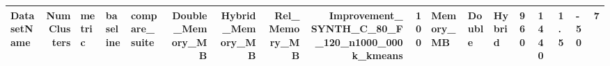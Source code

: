 \begin{tabular}{lrlllrrrrr}
\toprule
DatasetName & NumClusters & metric & baseline & compare_suite & Double_Memory_MB & Hybrid_Memory_MB & Rel_Memory_MB & Improvement_%
\midrule
SYNTH_C_80_F_120_n1000_000k_kmeans & 100 & Memory_MB & Double & Hybrid & 960 & 1440 & 1.5 & -50 & 7 \\
\bottomrule
\end{tabular}
